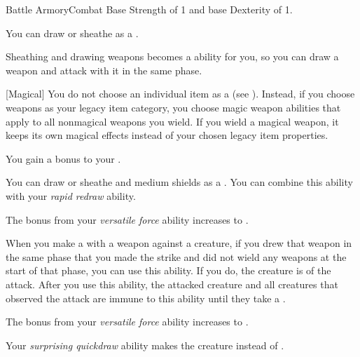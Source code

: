     \begin{feat}{Battle Armory}{Combat}
        \featpre Base Strength of 1 and base Dexterity of 1.

         You can draw or sheathe  as a .

         Sheathing and drawing weapons becomes a  ability for you, so you can draw a weapon and attack with it in the same phase.

        [Magical] You do not choose an individual item as a  (see ).
        Instead, if you choose weapons as your legacy item category, you choose magic weapon abilities that apply to all nonmagical weapons you wield.
        If you wield a magical weapon, it keeps its own magical effects instead of your chosen legacy item properties.

         You gain a  bonus to your .

         You can draw or sheathe  and medium shields as a .
        You can combine this ability with your \textit{rapid redraw} ability.

         The bonus from your \textit{versatile force} ability increases to .

         When you make a  with a weapon against a creature, if you drew that weapon in the same phase that you made the strike and did not wield any weapons at the start of that phase, you can use this ability.
        If you do, the creature is \partiallyunaware of the attack.
        After you use this ability, the attacked creature and all creatures that observed the attack are immune to this ability until they take a .

         The bonus from your \textit{versatile force} ability increases to .

         Your \textit{surprising quickdraw} ability makes the creature \unaware instead of \partiallyunaware.
    \end{feat}

